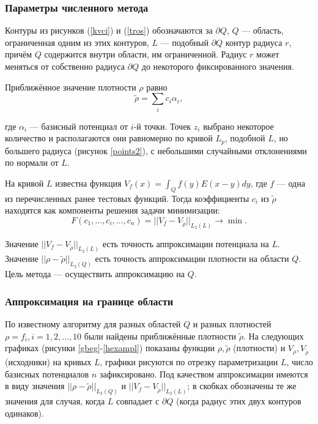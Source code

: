 \documentclass[a4paper]{article}
\newcommand{\V}[1]{\int_Q #1(y) E(x-y) dy}
\begin{document}
\subsubsection{Параметры численного метода}
Контуры из рисунков (\ref{kvci}) и (\ref{tros}) обозначаются за $\partial Q$, $Q$ --- область, ограниченная одним из этих контуров,
$L$ --- подобный $\partial Q$ контур радиуса $r$, причём $Q$ содержится внутри области, им ограниченной. Радиус $r$ может меняться от собственно радиуса $\partial Q$ до некоторого фиксированного значения.

Приближённое значение плотности $\rho$ равно
\begin{equation*}
  \tilde{\rho} = \sum_i c_i \alpha_i,
\end{equation*}

где $\alpha_i$ --- базисный потенциал от $i$-й точки.
Точек $z_i$ выбрано некоторое количество и располагаются они равномерно по кривой $L_p$, подобной $L$, но большего радиуса (рисунок \ref{points2}), с небольшими случайными отклонениями по нормали от $L$.

На кривой $L$ известна функция $V_f(x)=\V{f}$, где $f$ --- одна из перечисленных ранее тестовых функций.
Тогда коэффициенты $c_i$ из $\tilde{\rho}$ находятся как компоненты решения задачи минимизации:
\begin{equation*}
  F(c_1,\dots,c_i,\dots,c_n)=||V_f-V_{\tilde{\rho} } ||_{L_2(L)}\rightarrow \min.
\end{equation*}

Значение $||V_f-V_{\tilde{\rho} } ||_{L_2(L)}$ есть точность аппроксимации потенциала на $L$.
Значение $||\rho-\tilde{\rho} ||_{L_2(Q)}$ есть точность аппроксимации плотности на области $Q$.
Цель метода --- осуществить аппроксимацию на $Q$.

\subsubsection{Аппроксимация на границе области}
По известному алгоритму для разных областей $Q$ и разных плотностей $\rho=f_i,i=1,2,\dots,10$ были найдены приближённые плотности $\tilde{\rho}$.
На следующих графиках (рисунки \ref{gbeg}-\ref{hexampl}) показаны функции $\rho, \tilde{\rho}$ (плотности) и $V_{\rho},V_{\tilde{\rho}}$ (исходники) на кривых $L$, графики рисуются по отрезку параметризации $L$, число базисных потенциалов $n$ зафиксировано.
Под качеством аппроксимации имеются в виду значения $||\rho-\tilde{\rho} ||_{L_2(Q)}$ и $||V_f-V_{\tilde{\rho} } ||_{L_2(L)}$; в скобках обозначены те же значения для случая, когда $L$ совпадает с $\partial Q$ (когда радиус этих двух контуров одинаков).
\end{document}
